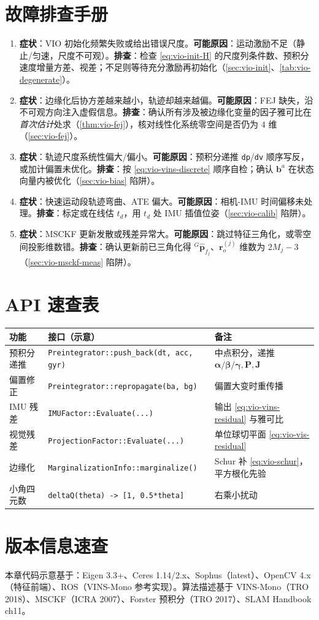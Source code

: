 \section*{故障排查手册}
\begin{enumerate}
  \item \textbf{症状}：VIO 初始化频繁失败或给出错误尺度。\textbf{可能原因}：运动激励不足（静止/匀速，尺度不可观）。\textbf{排查}：检查 \cref{eq:vio-init-H} 的尺度列条件数、预积分速度增量方差、视差；不足则等待充分激励再初始化（\cref{sec:vio-init}、\cref{tab:vio-degenerate}）。
  \item \textbf{症状}：边缘化后协方差越来越小，轨迹却越来越偏。\textbf{可能原因}：FEJ 缺失，沿不可观方向注入虚假信息。\textbf{排查}：确认所有涉及被边缘化变量的因子雅可比在\emph{首次估计}处求（\cref{thm:vio-fej}），核对线性化系统零空间是否仍为 $4$ 维（\cref{sec:vio-fej}）。
  \item \textbf{症状}：轨迹尺度系统性偏大/偏小。\textbf{可能原因}：预积分递推 \texttt{dp}/\allowbreak\texttt{dv} 顺序写反，或加计偏置未优化。\textbf{排查}：按 \cref{eq:vio-vins-discrete} 顺序自检；确认 $\mathbf{b}^a$ 在状态向量内被优化（\cref{sec:vio-bias} 陷阱）。
  \item \textbf{症状}：快速运动段轨迹弯曲、ATE 偏大。\textbf{可能原因}：相机-IMU 时间偏移未处理。\textbf{排查}：标定或在线估 $t_d$，用 $t_d$ 处 IMU 插值位姿（\cref{sec:vio-calib} 陷阱）。
  \item \textbf{症状}：MSCKF 更新发散或残差异常大。\textbf{可能原因}：跳过特征三角化，或零空间投影维数错。\textbf{排查}：确认更新前已三角化得 ${}^G\hat{\mathbf{p}}_{f_j}$、$\mathbf{r}_o^{(j)}$ 维数为 $2M_j-3$（\cref{sec:vio-msckf-meas} 陷阱）。
\end{enumerate}

\section*{API 速查表}
\begin{table}[H]\centering\small
\begin{tabular}{lll}
\toprule
功能 & 接口（示意） & 备注 \\
\midrule
预积分递推 & \texttt{Preintegrator::push\_back(dt, acc, gyr)} & 中点积分，递推 $\boldsymbol{\alpha}/\boldsymbol{\beta}/\boldsymbol{\gamma},\mathbf{P},\mathbf{J}$ \\
偏置修正 & \texttt{Preintegrator::repropagate(ba, bg)} & 偏置大变时重传播 \\
IMU 残差 & \texttt{IMUFactor::Evaluate(...)} & 输出 \cref{eq:vio-vins-residual} 与雅可比 \\
视觉残差 & \texttt{ProjectionFactor::Evaluate(...)} & 单位球切平面 \cref{eq:vio-vis-residual} \\
边缘化 & \texttt{MarginalizationInfo::marginalize()} & Schur 补 \cref{eq:vio-schur}，平方根化先验 \\
小角四元数 & \texttt{deltaQ(theta) -> [1, 0.5*theta]} & 右乘小扰动 \\
\bottomrule
\end{tabular}
\end{table}

\section*{版本信息速查}
本章代码示意基于：Eigen 3.3+、Ceres 1.14/2.x、Sophus（latest）、OpenCV 4.x（特征前端）、ROS（VINS-Mono 参考实现）。算法描述基于 VINS-Mono（TRO 2018）、MSCKF（ICRA 2007）、Forster 预积分（TRO 2017）、SLAM Handbook ch11。
